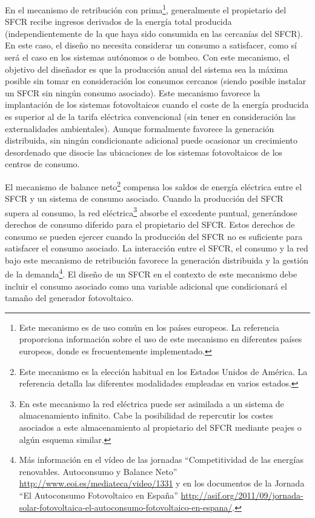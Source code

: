 En el mecanismo de retribución con prima\footnote{Este
mecanismo es de uso común en los países europeos. La referencia
\citep{Collado2009} proporciona información sobre el uso de este
mecanismo en diferentes países europeos, donde es frecuentemente
implementado.}, generalmente el propietario
del SFCR recibe ingresos derivados de la energía total producida
(independientemente de la que haya sido consumida en las cercanías del
SFCR). En este caso, el diseño no necesita considerar un consumo a
satisfacer, como sí será el caso en los sistemas autónomos o de
bombeo. Con este mecanismo, el objetivo del diseñador es que la
producción anual del sistema sea la máxima posible sin tomar en
consideración los consumos cercanos (siendo posible instalar un SFCR
sin ningún consumo asociado). Este mecanismo favorece la implantación
de los sistemas fotovoltaicos cuando el coste de la energía producida
es superior al de la tarifa eléctrica convencional (sin tener en
consideración las externalidades ambientales). Aunque formalmente
favorece la generación distribuida, sin ningún condicionante adicional
puede ocasionar un crecimiento desordenado que disocie las ubicaciones
de los sistemas fotovoltaicos de los centros de consumo. 

El mecanismo de balance neto\footnote{Este mecanismo es la elección
habitual en los Estados Unidos de América. La referencia \citep{Chapman.Rose2011}
detalla las diferentes modalidades empleadas en varios estados.} compensa los saldos de energía eléctrica
entre el SFCR y un sistema de consumo asociado. Cuando la producción
del SFCR supera al consumo, la red eléctrica\footnote{En este
  mecanismo la red eléctrica puede ser asimilada a un sistema de
  almacenamiento infinito. Cabe la posibilidad de repercutir los
  costes asociados a este almacenamiento al propietario del SFCR
  mediante peajes o algún esquema similar.} absorbe el excedente
puntual, generándose derechos de consumo diferido para el propietario
del SFCR. Estos derechos de consumo se pueden ejercer cuando la
producción del SFCR no es suficiente para satisfacer el consumo
asociado. La interacción entre el SFCR, el consumo y la red bajo este
mecanismo de retribución favorece la generación distribuida y la
gestión de la demanda\footnote{Más información en el vídeo de las
  jornadas ``Competitividad de las energías renovables. Autoconsumo y
  Balance Neto'' \url{http://www.eoi.es/mediateca/video/1331} y en los
  documentos de la Jornada ``El Autoconsumo Fotovoltaico en España''
  \url{http://asif.org/2011/09/jornada-solar-fotovoltaica-el-autoconsumo-fotovoltaico-en-espana/}.}.
El diseño de un SFCR en el contexto de este mecanismo debe incluir el
consumo asociado como una variable adicional que condicionará el
tamaño del generador fotovoltaico. 

